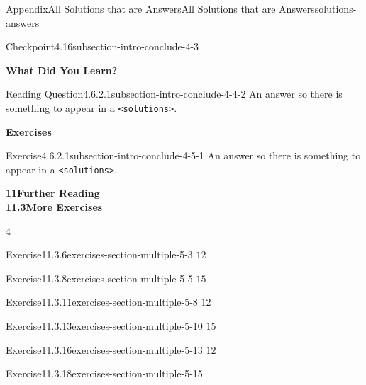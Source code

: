 \documentclass[twoside,10pt,]{article}
\newcommand{\mono}[1]{\texttt{#1}}
\numberwithin{equation}{section}
\begin{document}
\begin{solutions-section}{Appendix}{All Solutions that are Answers}{}{All Solutions that are Answers}{}{}{solutions-answers}
\begin{inlinesolution}{Checkpoint}{4.16}{}{subsection-intro-conclude-4-3}
\end{inlinesolution}%
\par\medskip
\noindent\textbf{\normalsize{}\textperiodcentered\space{}What Did You Learn?}
\begin{divisionsolution}{Reading Question}{4.6.2.1}{}{subsection-intro-conclude-4-4-2}%
\noindent\hypertarget{subsection-intro-conclude-4-4-2-2-back}{}An answer so there is something to appear in a \mono{<solutions>}.%
\end{divisionsolution}%
\par\medskip
\noindent\textbf{\normalsize{}\textperiodcentered\space{}Exercises}
\begin{divisionsolution}{Exercise}{4.6.2.1}{}{subsection-intro-conclude-4-5-1}%
\noindent\hypertarget{subsection-intro-conclude-4-5-1-2-back}{}An answer so there is something to appear in a \mono{<solutions>}.%
\end{divisionsolution}%
\par\medskip
\noindent\textbf{\large{}11\space\textperiodcentered\space{}Further Reading\\
11.3\space\textperiodcentered\space{}More Exercises}
\begin{exercisegroupcol}{4}
\begin{divisionsolutionegcol}{Exercise}{11.3.6}{}{exercises-section-multiple-5-3}%
\noindent\hypertarget{exercises-section-multiple-5-3-3-back}{}\(12\)%
\end{divisionsolutionegcol}%
\begin{divisionsolutionegcol}{Exercise}{11.3.8}{}{exercises-section-multiple-5-5}%
\noindent\hypertarget{exercises-section-multiple-5-5-2-back}{}\(15\)%
\end{divisionsolutionegcol}%
\begin{divisionsolutionegcol}{Exercise}{11.3.11}{}{exercises-section-multiple-5-8}%
\noindent\hypertarget{exercises-section-multiple-5-8-3-back}{}\(12\)%
\end{divisionsolutionegcol}%
\begin{divisionsolutionegcol}{Exercise}{11.3.13}{}{exercises-section-multiple-5-10}%
\noindent\hypertarget{exercises-section-multiple-5-10-2-back}{}\(15\)%
\end{divisionsolutionegcol}%
\begin{divisionsolutionegcol}{Exercise}{11.3.16}{}{exercises-section-multiple-5-13}%
\noindent\hypertarget{exercises-section-multiple-5-13-3-back}{}\(12\)%
\end{divisionsolutionegcol}%
\begin{divisionsolutionegcol}{Exercise}{11.3.18}{}{exercises-section-multiple-5-15}%

\end{divisionsolutionegcol}
\end{exercisegroupcol}
\end{solutions-section}
\end{document}
